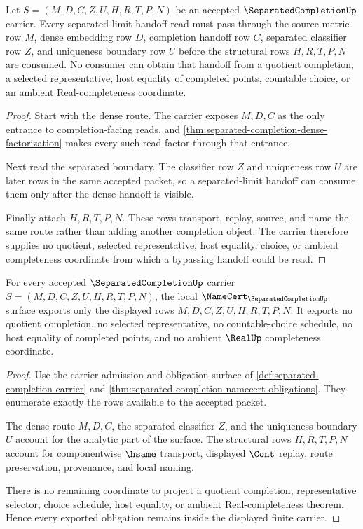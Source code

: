 \begin{theorem}
\label{thm:separatedcompletion-separated-limit-handoff}
Let $S=(M,D,C,Z,U,H,R,T,P,N)$ be an accepted $\SeparatedCompletionUp$ carrier. Every separated-limit handoff read must pass through the source metric row $M$, dense embedding row $D$, completion handoff row $C$, separated classifier row $Z$, and uniqueness boundary row $U$ before the structural rows $H,R,T,P,N$ are consumed. No consumer can obtain that handoff from a quotient completion, a selected representative, host equality of completed points, countable choice, or an ambient Real-completeness coordinate.
\end{theorem}
\begin{proof}
Start with the dense route. The carrier exposes $M,D,C$ as the only entrance to completion-facing reads, and \autoref{thm:separated-completion-dense-factorization} makes every such read factor through that entrance.

Next read the separated boundary. The classifier row $Z$ and uniqueness row $U$ are later rows in the same accepted packet, so a separated-limit handoff can consume them only after the dense handoff is visible.

Finally attach $H,R,T,P,N$. These rows transport, replay, source, and name the same route rather than adding another completion object. The carrier therefore supplies no quotient, selected representative, host equality, choice, or ambient completeness coordinate from which a bypassing handoff could be read.
\end{proof}

\begin{theorem}
\label{thm:separatedcompletion-nonescape-obligation}
For every accepted $\SeparatedCompletionUp$ carrier $S=(M,D,C,Z,U,H,R,T,P,N)$, the local $\NameCert_{\SeparatedCompletionUp}$ surface exports only the displayed rows $M,D,C,Z,U,H,R,T,P,N$. It exports no quotient completion, no selected representative, no countable-choice schedule, no host equality of completed points, and no ambient $\RealUp$ completeness coordinate.
\end{theorem}
\begin{proof}
Use the carrier admission and obligation surface of \autoref{def:separated-completion-carrier} and \autoref{thm:separated-completion-namecert-obligations}. They enumerate exactly the rows available to the accepted packet.

The dense route $M,D,C$, the separated classifier $Z$, and the uniqueness boundary $U$ account for the analytic part of the surface. The structural rows $H,R,T,P,N$ account for componentwise $\hsame$ transport, displayed $\Cont$ replay, route preservation, provenance, and local naming.

There is no remaining coordinate to project a quotient completion, representative selector, choice schedule, host equality, or ambient Real-completeness theorem. Hence every exported obligation remains inside the displayed finite carrier.
\end{proof}

